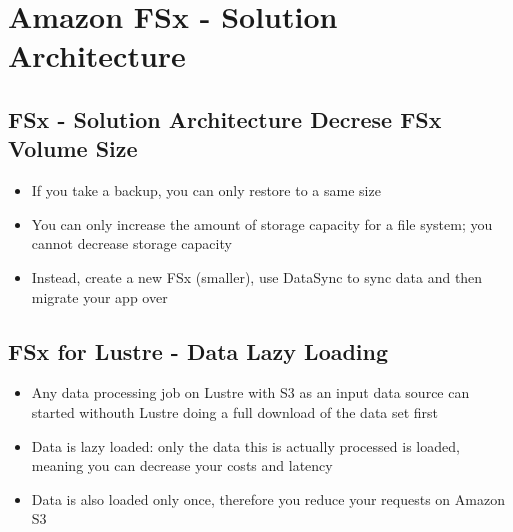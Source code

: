 \section{Amazon FSx - Solution Architecture}

\subsection{FSx - Solution Architecture Decrese FSx Volume Size}
\begin{itemize}
    \item If you take a backup, you can only restore to a same size
    \item You can only increase the amount of storage capacity for a file system; you cannot decrease storage capacity
    \item Instead, create a new FSx (smaller), use DataSync to sync data and then migrate your app over
\end{itemize}

\subsection{FSx for Lustre - Data Lazy Loading}
\begin{itemize}
    \item Any data processing job on Lustre with S3 as an input data source can started withouth Lustre doing a full download of the data set first
    \item Data is lazy loaded: only the data this is actually processed is loaded, meaning you can decrease your costs and latency
    \item Data is also loaded only once, therefore you reduce your requests on Amazon S3
\end{itemize}


